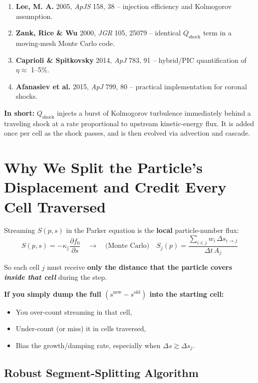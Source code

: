 \begin{enumerate}
  \item \textbf{Lee, M. A.} 2005, \textit{ApJS} 158, 38 – injection efficiency and Kolmogorov assumption.
  \item \textbf{Zank, Rice \& Wu} 2000, \textit{JGR} 105, 25079 – identical $Q_{\text{shock}}$ term in a moving-mesh Monte Carlo code.
  \item \textbf{Caprioli \& Spitkovsky} 2014, \textit{ApJ} 783, 91 – hybrid/PIC quantification of $\eta \approx$ 1--5\%.
  \item \textbf{Afanasiev et al.} 2015, \textit{ApJ} 799, 80 – practical implementation for coronal shocks.
\end{enumerate}

\bigskip

\noindent
\textbf{In short:} $Q_{\text{shock}}$ injects a burst of Kolmogorov turbulence immediately behind a traveling shock at a rate proportional to upstream kinetic-energy flux. It is added once per cell as the shock passes, and is then evolved via advection and cascade.

\section*{Why We \textbf{Split} the Particle’s Displacement and Credit Every Cell Traversed}

Streaming $S(p,s)$ in the Parker equation is the \textbf{local} particle-number flux:
\[
S(p,s) = -\kappa_\parallel \frac{\partial f_0}{\partial s}
\quad \longrightarrow \quad
\text{(Monte Carlo)} \quad
S_j(p) = \frac{\sum_{i\in j} w_i\,\Delta s_{i \to j}}{\Delta t\,A_j}
\]

So each cell $j$ must receive \textbf{only the distance that the particle covers \emph{inside that cell}} during the step.

\textbf{If you simply dump the full $(s^{\text{new}} - s^{\text{old}})$ into the starting cell:}
\begin{itemize}
    \item You over-count streaming in that cell,
    \item Under-count (or miss) it in cells traversed,
    \item Bias the growth/damping rate, especially when $\Delta s \gtrsim \Delta s_j$.
\end{itemize}

\subsection*{Robust Segment-Splitting Algorithm}

